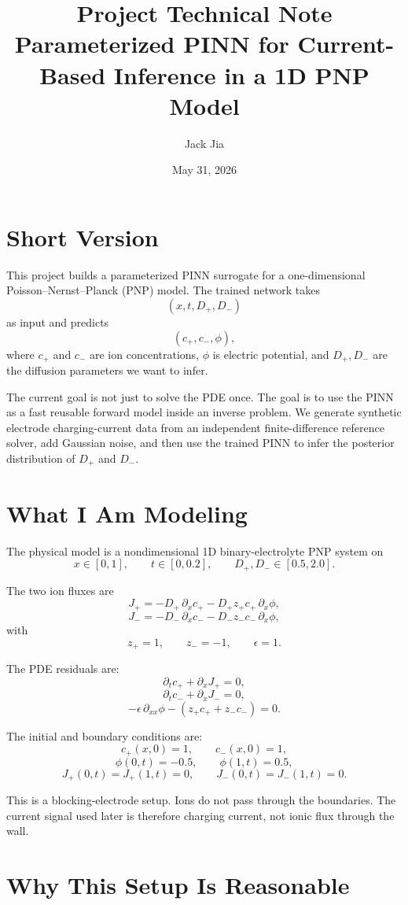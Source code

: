 \documentclass[11pt]{article}
\title{\vspace{-2em}\textbf{Project Technical Note}\\
\large Parameterized PINN for Current-Based Inference in a 1D PNP Model}
\author{Jack Jia}
\date{May 31, 2026}
\newcommand{\cp}{c_{+}}
\newcommand{\cn}{c_{-}}
\newcommand{\ph}{\phi}
\newcommand{\Dp}{D_{+}}
\newcommand{\Dn}{D_{-}}
\newcommand{\Jp}{J_{+}}
\newcommand{\Jn}{J_{-}}
\begin{document}
\maketitle

\section*{Short Version}

This project builds a parameterized PINN surrogate for a one-dimensional
Poisson--Nernst--Planck (PNP) model. The trained network takes
\[
  (x,t,\Dp,\Dn)
\]
as input and predicts
\[
  (\cp,\cn,\ph),
\]
where $\cp$ and $\cn$ are ion concentrations, $\ph$ is electric potential, and
$\Dp,\Dn$ are the diffusion parameters we want to infer.

The current goal is not just to solve the PDE once. The goal is to use the PINN
as a fast reusable forward model inside an inverse problem. We generate
synthetic electrode charging-current data from an independent finite-difference
reference solver, add Gaussian noise, and then use the trained PINN to infer the
posterior distribution of $\Dp$ and $\Dn$.

\section*{What I Am Modeling}

The physical model is a nondimensional 1D binary-electrolyte PNP system on
\[
  x\in[0,1],\qquad t\in[0,0.2],\qquad \Dp,\Dn\in[0.5,2.0].
\]

The two ion fluxes are
\[
  \Jp = -\Dp\,\partial_x\cp - \Dp z_+\cp\,\partial_x\ph,
\]
\[
  \Jn = -\Dn\,\partial_x\cn - \Dn z_-\cn\,\partial_x\ph,
\]
with
\[
  z_+=1,\qquad z_-=-1,\qquad \epsilon=1.
\]

The PDE residuals are:
\[
  \partial_t\cp+\partial_x\Jp=0,
\]
\[
  \partial_t\cn+\partial_x\Jn=0,
\]
\[
  -\epsilon\,\partial_{xx}\ph-(z_+\cp+z_-\cn)=0.
\]

The initial and boundary conditions are:
\[
  \cp(x,0)=1,\qquad \cn(x,0)=1,
\]
\[
  \ph(0,t)=-0.5,\qquad \ph(1,t)=0.5,
\]
\[
  \Jp(0,t)=\Jp(1,t)=0,\qquad \Jn(0,t)=\Jn(1,t)=0.
\]

This is a blocking-electrode setup. Ions do not pass through the boundaries.
The current signal used later is therefore charging current, not ionic flux
through the wall.

\section*{Why This Setup Is Reasonable}
\end{document}
